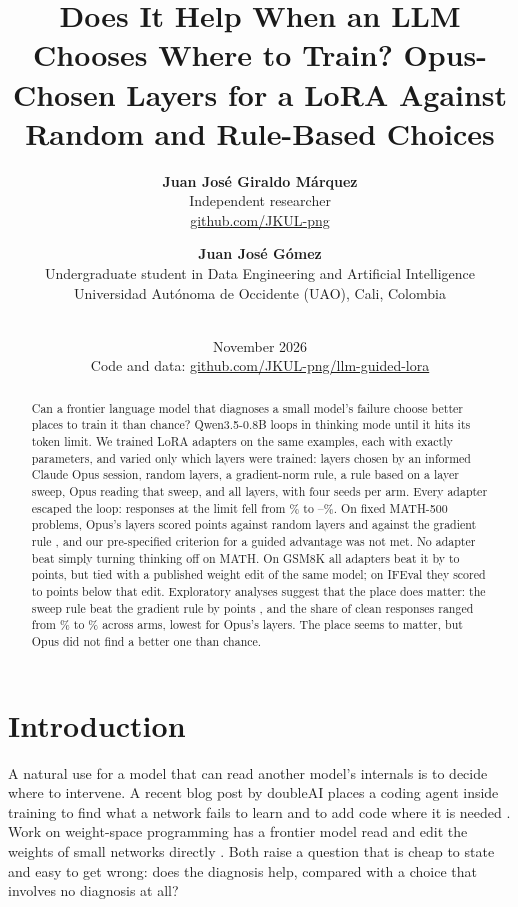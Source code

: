 \documentclass[11pt]{article}
\title{Does It Help When an LLM Chooses Where to Train? Opus-Chosen Layers for a LoRA Against Random and Rule-Based Choices}
\author{%
  \textbf{Juan Jos\'e Giraldo M\'arquez}\\
  Independent researcher\\
  \href{https://github.com/JKUL-png}{github.com/JKUL-png}
  \and
  \textbf{Juan Jos\'e G\'omez}\\
  Undergraduate student in Data Engineering and Artificial Intelligence\\
  Universidad Aut\'onoma de Occidente (UAO), Cali, Colombia
}
\date{\ifx\DraftMark\empty\else\textbf{\DraftMark}\\[.3em]\fi November 2026\\[.6em]
  \small Code and data: \href{https://github.com/JKUL-png/llm-guided-lora}{github.com/JKUL-png/llm-guided-lora}}
\begin{document}
\maketitle

\begin{abstract}
Can a frontier language model that diagnoses a small model's failure choose better places to train it than chance? Qwen3.5-0.8B loops in thinking mode until it hits its token limit. We trained \NLora{} LoRA adapters on the same \NExamples{} examples, each with exactly \ParamsLora{} parameters, and varied only which layers were trained: layers chosen by an informed Claude Opus session, random layers, a gradient-norm rule, a rule based on a layer sweep, Opus reading that sweep, and all \NModelLayers{} layers, with four seeds per arm. Every adapter escaped the loop: responses at the limit fell from \% to --\%. On \NMath{} fixed MATH-500 problems, Opus's layers scored  points against random layers  and  against the gradient rule , and our pre-specified criterion for a guided advantage was not met. No adapter beat simply turning thinking off on MATH. On GSM8K all adapters beat it by  to  points, but tied with a published weight edit of the same model; on IFEval they scored  to  points below that edit. Exploratory analyses suggest that the place does matter: the sweep rule beat the gradient rule by  points , and the share of clean responses ranged from \% to \% across arms, lowest for Opus's layers. The place seems to matter, but Opus did not find a better one than chance.
\end{abstract}

\section{Introduction}\label{sec:1}

A natural use for a model that can read another model's internals is to decide where to intervene. A recent blog post by doubleAI places a coding agent inside training to find what a network fails to learn and to add code where it is needed \citep{doubleai2026}. Work on weight-space programming has a frontier model read and edit the weights of small networks directly \citep{takehi2026}. Both raise a question that is cheap to state and easy to get wrong: does the diagnosis help, compared with a choice that involves no diagnosis at all?
\end{document}
